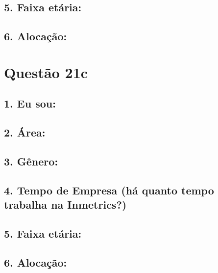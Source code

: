\documentclass[]{book}
\begin{document}
\hypertarget{faixa-etaria-62}{%
\subsection{5. Faixa etária:}\label{faixa-etaria-62}}

\hypertarget{alocacao-62}{%
\subsection{6. Alocação:}\label{alocacao-62}}

\hypertarget{questao-21c}{%
\section{Questão 21c}\label{questao-21c}}

\hypertarget{eu-sou-63}{%
\subsection{1. Eu sou:}\label{eu-sou-63}}

\hypertarget{area-63}{%
\subsection{2. Área:}\label{area-63}}

\hypertarget{genero-63}{%
\subsection{3. Gênero:}\label{genero-63}}

\hypertarget{tempo-de-empresa-ha-quanto-tempo-trabalha-na-inmetrics-63}{%
\subsection{4. Tempo de Empresa (há quanto tempo trabalha na Inmetrics?)}\label{tempo-de-empresa-ha-quanto-tempo-trabalha-na-inmetrics-63}}

\hypertarget{faixa-etaria-63}{%
\subsection{5. Faixa etária:}\label{faixa-etaria-63}}

\hypertarget{alocacao-63}{%
\subsection{6. Alocação:}\label{alocacao-63}}
\end{document}
